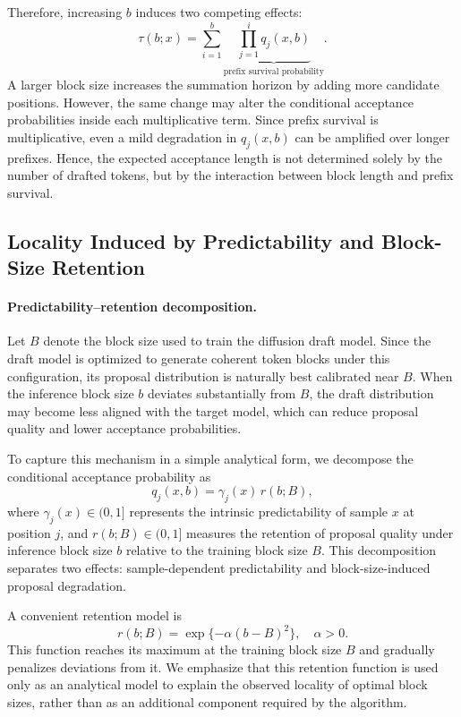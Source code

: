 \documentclass{llmxive}
\begin{document}
Therefore, increasing $b$ induces two competing effects:
\begin{equation}
\tau(b;x)
=
\sum_{i=1}^{b}
\underbrace{
\prod_{j=1}^{i}
q_j(x,b)
}_{\text{prefix survival probability}}.
\end{equation}
A larger block size increases the summation horizon by adding more candidate positions. However, the same change may alter the conditional acceptance probabilities inside each multiplicative term. Since prefix survival is multiplicative, even a mild degradation in $q_j(x,b)$ can be amplified over longer prefixes. Hence, the expected acceptance length is not determined solely by the number of drafted tokens, but by the interaction between block length and prefix survival.

\subsection{Locality Induced by Predictability and Block-Size Retention}

\paragraph{Predictability--retention decomposition.}
Let $B$ denote the block size used to train the diffusion draft model. Since the draft model is optimized to generate coherent token blocks under this configuration, its proposal distribution is naturally best calibrated near $B$. When the inference block size $b$ deviates substantially from $B$, the draft distribution may become less aligned with the target model, which can reduce proposal quality and lower acceptance probabilities.

To capture this mechanism in a simple analytical form, we decompose the conditional acceptance probability as
\begin{equation}
q_j(x,b)
=
\gamma_j(x)\, r(b;B),
\end{equation}
where $\gamma_j(x)\in(0,1]$ represents the intrinsic predictability of sample $x$ at position $j$, and $r(b;B)\in(0,1]$ measures the retention of proposal quality under inference block size $b$ relative to the training block size $B$. This decomposition separates two effects: sample-dependent predictability and block-size-induced proposal degradation.

A convenient retention model is
\begin{equation}
r(b;B)
=
\exp\{-\alpha(b-B)^2\},
\quad
\alpha>0.
\end{equation}
This function reaches its maximum at the training block size $B$ and gradually penalizes deviations from it. We emphasize that this retention function is used only as an analytical model to explain the observed locality of optimal block sizes, rather than as an additional component required by the algorithm.
\end{document}
